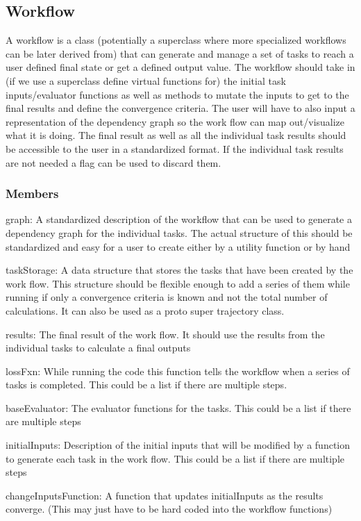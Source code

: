 \documentclass [notitlepage, 12pt, a4paper]{article}
\begin{document}
\subsection{Workflow}
A workflow is a class (potentially a superclass where more specialized workflows can be later derived from) that can generate and manage a set of tasks to reach a user defined final state or get a defined output value.
The workflow should take in (if we use a superclass define virtual functions for) the initial task inputs/evaluator functions as well as methods to mutate the inputs to get to the final results and define the convergence criteria.
The user will have to also input a representation of the dependency graph so the work flow can map out/visualize what it is doing.
The final result as well as all the individual task results should be accessible to the user in a standardized format.
If the individual task results are not needed a flag can be used to discard them.
\subsubsection{Members}
    graph: A standardized description of the workflow that can be used to generate a dependency graph for the individual tasks. The actual structure of this should be standardized and easy for a user to create either by a utility function or by hand

    taskStorage: A data structure that stores the tasks that have been created by the work flow. This structure should be flexible enough to add a series of them while running if only a convergence criteria is known and not the total number of calculations. It can also be used as a proto super trajectory class.

    results: The final result of the work flow. It should use the results from the individual tasks to calculate a final outputs

    lossFxn: While running the code this function tells the workflow when a series of tasks is completed. This could be a list if there are multiple steps.

    baseEvaluator: The evaluator functions for the tasks. This could be a list if there are multiple steps

    initialInputs: Description of the initial inputs that will be modified by a function to generate each task in the work flow. This could be a list if there are multiple steps

    changeInputsFunction: A function that updates initialInputs as the results converge. (This may just have to be hard coded into the workflow functions)
\end{document}
